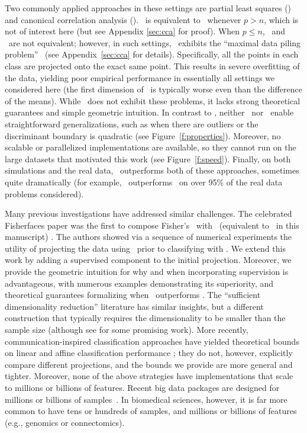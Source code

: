 \documentclass[11pt]{extarticle}
\begin{document}
Two commonly applied approaches in these settings are partial least squares (\Pls) and canonical correlation analysis (\Cca). \Cca~is equivalent to \Lda~whenever $p>n$, which is not of interest here (but see Appendix \ref{sec:cca} for proof).  When $p\le n$, \Cca~and \Lda~are not equivalent; however, in such settings, \Cca~exhibits the ``maximal data piling problem''~\cite{maximum1}  (see Appendix~\ref{sec:cca} for details).  Specifically, all the points in each class are projected onto the exact same point. This results in severe overfitting of the data, yielding poor empirical performance in essentially all settings we considered here (the first dimension of \Cca~is typically worse even than the difference of the means).  While \Pls~does not exhibit these problems, it lacks strong theoretical guarantees and simple geometric intuition.  In contrast to \Lol, neither \Cca~nor \Pls~enable straightforward generalizations, such as when there are outliers or the discriminant boundary is quadratic (see Figure~\ref{f:properties}). Moreover, no scalable or parallelized implementations are available, so they cannot run on the large datasets that motivated this work (see Figure~\ref{f:speed}). Finally, on both simulations and the real data, \Lol~outperforms both of these approaches, sometimes quite dramatically (for example, \Lol~outperforms \Cca~on over 95\% of the real data problems considered).

%
Many previous investigations have addressed similar challenges.
The celebrated Fisherfaces paper was the first to compose Fisher's \Lda~with \Pca~(equivalent to \Pca~in this manuscript) \cite{Belhumeur1997a}.  The authors showed via a sequence of numerical experiments the utility of projecting the data using \Pca~prior to classifying with \Lda.  
We extend this work by adding a supervised component to the initial projection.  Moreover, we provide the geometric intuition for why and when incorporating supervision is advantageous, with numerous examples demonstrating its superiority, and theoretical guarantees formalizing when \Lol~outperforms \Pca.
The ``sufficient dimensionality reduction'' literature has  similar insights, but a different construction that typically requires the dimensionality to be smaller than the sample size \cite{Li1991a, Tishby1999a, Globerson2003a, Cook2005a,Fukumizu2004a} (although see \cite{Cook2013} for some promising work). More recently, communication-inspired classification approaches have yielded theoretical bounds on linear and affine classification performance \cite{Nokleby2015}; they do not, however, explicitly compare different projections, and the bounds we provide are more general and tighter.
%
Moreover, none of the above strategies have implementations that scale to millions or billions of features.
Recent big data packages are designed for millions or billions of  samples~\cite{Agarwal2014,abadi2016tensorflow}.  In biomedical sciences, however, it is far more common to have tens or hundreds of samples, and millions or billions of features (e.g., genomics or connectomics).
\end{document}
